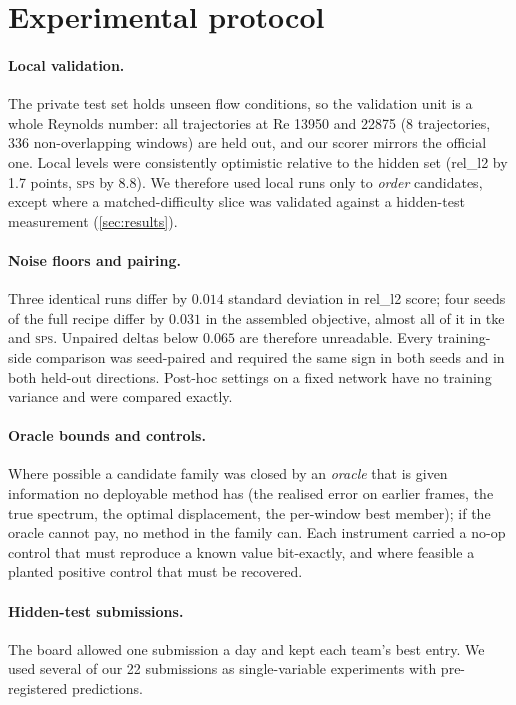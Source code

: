 \documentclass[10pt]{article}
\newcommand{\sps}{\textsc{sps}}
\begin{document}
\section{Experimental protocol}
\label{sec:protocol}

\paragraph{Local validation.} The private test set holds unseen flow conditions, so the validation unit is a whole Reynolds number: all trajectories at Re 13950 and 22875 (8 trajectories, 336 non-overlapping windows) are held out, and our scorer mirrors the official one. Local levels were consistently optimistic relative to the hidden set (rel\_l2 by 1.7 points, \sps{} by 8.8). We therefore used local runs only to \emph{order} candidates, except where a matched-difficulty slice was validated against a hidden-test measurement (\cref{sec:results}).

\paragraph{Noise floors and pairing.} Three identical runs differ by $0.014$ standard deviation in rel\_l2 score; four seeds of the full recipe differ by $0.031$ in the assembled objective, almost all of it in tke and \sps{}. Unpaired deltas below $0.065$ are therefore unreadable. Every training-side comparison was seed-paired and required the same sign in both seeds and in both held-out directions. Post-hoc settings on a fixed network have no training variance and were compared exactly.

\paragraph{Oracle bounds and controls.} Where possible a candidate family was closed by an \emph{oracle} that is given information no deployable method has (the realised error on earlier frames, the true spectrum, the optimal displacement, the per-window best member); if the oracle cannot pay, no method in the family can. Each instrument carried a no-op control that must reproduce a known value bit-exactly, and where feasible a planted positive control that must be recovered.

\paragraph{Hidden-test submissions.} The board allowed one submission a day and kept each team's best entry. We used several of our 22 submissions as single-variable experiments with pre-registered predictions.
\end{document}
